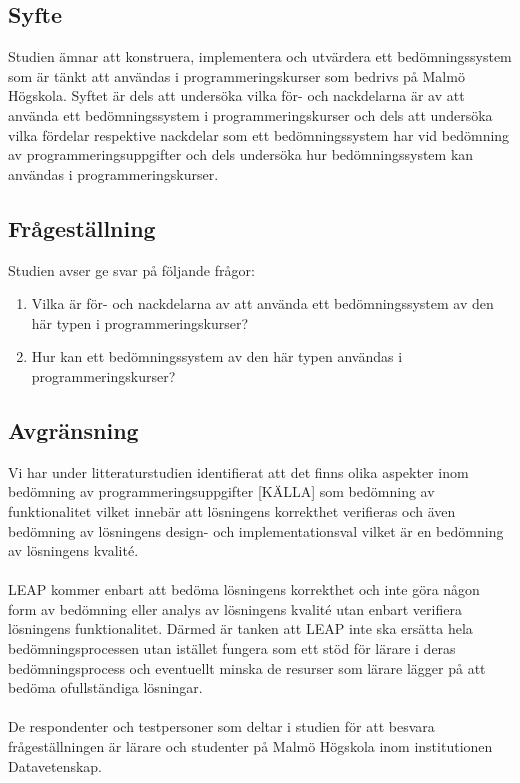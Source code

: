 \documentclass[a4paper,11pt]{article}
\begin{document}
{\subsection{Syfte}

Studien ämnar att konstruera, implementera och utvärdera ett bedömningssystem som är tänkt att användas i programmeringskurser som bedrivs på Malmö Högskola. Syftet är dels att undersöka vilka för- och nackdelarna är av att använda ett bedömningssystem i programmeringskurser och dels att undersöka vilka fördelar respektive nackdelar som ett bedömningssystem har vid bedömning av programmeringsuppgifter och dels undersöka hur bedömningssystem kan användas i programmeringskurser.

\subsection{Frågeställning}

Studien avser ge svar på följande frågor:

\begin{enumerate}
\item
Vilka är för- och nackdelarna av att använda ett bedömningssystem av den här typen i programmeringskurser?
\item
Hur kan ett bedömningssystem av den här typen användas i programmeringskurser?
\end{enumerate}

\subsection{Avgränsning}

Vi har under litteraturstudien identifierat att det finns olika aspekter inom bedömning av programmeringsuppgifter [KÄLLA] som bedömning av funktionalitet vilket innebär att lösningens korrekthet verifieras och även bedömning av lösningens design- och implementationsval vilket är en bedömning av lösningens kvalité.
\\
\\
LEAP kommer enbart att bedöma lösningens korrekthet och inte göra någon form av bedömning eller analys av lösningens kvalité utan enbart verifiera lösningens funktionalitet. Därmed är tanken att LEAP inte ska ersätta hela bedömningsprocessen utan istället fungera som ett stöd för lärare i deras bedömningsprocess och eventuellt minska de resurser som lärare lägger på att bedöma ofullständiga lösningar.
\\
\\
De respondenter och testpersoner som deltar i studien för att besvara frågeställningen är lärare och studenter på Malmö Högskola inom institutionen Datavetenskap.

}
\end{document}
